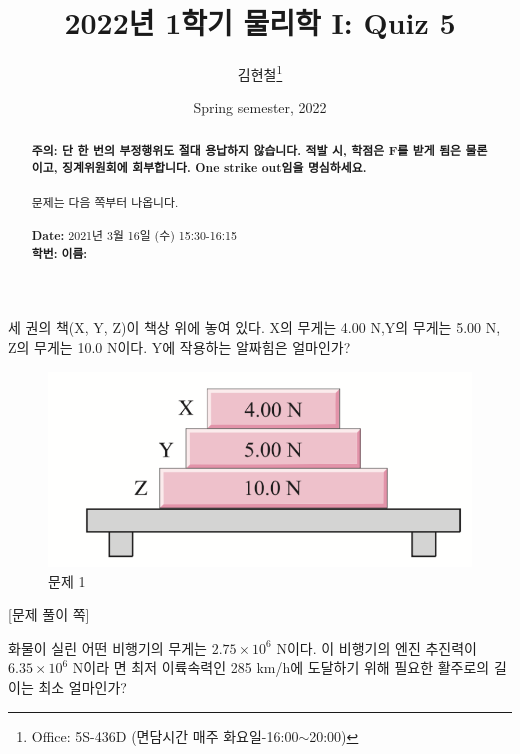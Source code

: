\documentclass[floatfix,nofootinbib,superscriptaddress,fleqn,preprint]{revtex4}
\begin{document}
\title{\Large 2022년 1학기 물리학 I: Quiz 5}
\author{김현철\footnote{Office: 5S-436D (면담시간 매주
    화요일-16:00$\sim$20:00)}} 
\date{Spring semester, 2022}


\vspace{1.cm}
\begin{abstract}
\noindent \textbf{ {\color{red}주의}: \color{blue} 단 한 번의 부정행위도 절대
  용납하지 않습니다. 적발 시, 학점은 F를 받게 됨은 물론이고,
  징계위원회에 회부합니다. One strike out임을 명심하세요.}\\
\\
문제는 다음 쪽부터 나옵니다.  \\ \\
{\bf Date:} 2021년 3월 16일 (수) 15:30-16:15 
\\
{\bf 학번:} \hspace{4cm}
{\bf 이름:} 

\end{abstract}
\maketitle

세 권의 책(X, Y, Z)이 책상 위에 놓여 있다. X의
무게는 4.00 N,Y의 무게는 5.00 N, Z의 무게는 10.0 N이다. Y에 작용하는
알짜힘은 얼마인가? 
\begin{figure}[ht]
  \centering
\includegraphics[scale=0.6]{Qfig5-1.pdf}  
  \caption{문제 1}
  \label{fig:1}
\end{figure}
\newpage

{\color{gray} [문제 풀이 쪽]}

\newpage 

화물이 실린 어떤 비행기의 무게는 $2.75\times
10^6$ N이다. 이 비행기의 엔진 추진력이 $6.35\times10^6$ N이라 면 최저
이륙속력인 285 km/h에 도달하기 위해 필요한 활주로의 길이는 최소
얼마인가?  
\newpage
\end{document}
